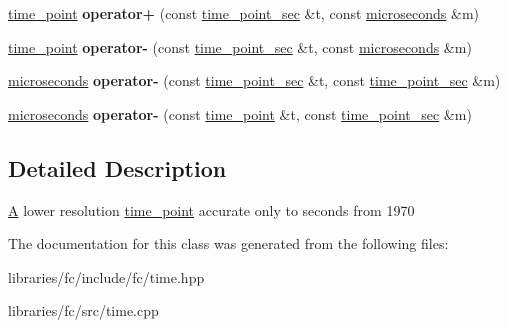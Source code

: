 \begin{DoxyCompactItemize}
\item 
\mbox{\label{classfc_1_1time__point__sec_a33d1bd167b2e7986485b0979250b4b55}} 
\mbox{\hyperlink{classfc_1_1time__point}{time\+\_\+point}} {\bfseries operator+} (const \mbox{\hyperlink{classfc_1_1time__point__sec}{time\+\_\+point\+\_\+sec}} \&t, const \mbox{\hyperlink{classfc_1_1microseconds}{microseconds}} \&m)
\item 
\mbox{\label{classfc_1_1time__point__sec_ab0485dce4d4b0fc5813b33818ff03692}} 
\mbox{\hyperlink{classfc_1_1time__point}{time\+\_\+point}} {\bfseries operator-\/} (const \mbox{\hyperlink{classfc_1_1time__point__sec}{time\+\_\+point\+\_\+sec}} \&t, const \mbox{\hyperlink{classfc_1_1microseconds}{microseconds}} \&m)
\item 
\mbox{\label{classfc_1_1time__point__sec_a40c52d6b3551ec223d707d9ba128dc9b}} 
\mbox{\hyperlink{classfc_1_1microseconds}{microseconds}} {\bfseries operator-\/} (const \mbox{\hyperlink{classfc_1_1time__point__sec}{time\+\_\+point\+\_\+sec}} \&t, const \mbox{\hyperlink{classfc_1_1time__point__sec}{time\+\_\+point\+\_\+sec}} \&m)
\item 
\mbox{\label{classfc_1_1time__point__sec_a1a8ae19b63eb263fc2435ef5ac9bf4f1}} 
\mbox{\hyperlink{classfc_1_1microseconds}{microseconds}} {\bfseries operator-\/} (const \mbox{\hyperlink{classfc_1_1time__point}{time\+\_\+point}} \&t, const \mbox{\hyperlink{classfc_1_1time__point__sec}{time\+\_\+point\+\_\+sec}} \&m)
\end{DoxyCompactItemize}


\subsection{Detailed Description}
\mbox{\hyperlink{struct_a}{A}} lower resolution \mbox{\hyperlink{classfc_1_1time__point}{time\+\_\+point}} accurate only to seconds from 1970 

The documentation for this class was generated from the following files\+:\begin{DoxyCompactItemize}
\item 
libraries/fc/include/fc/time.\+hpp\item 
libraries/fc/src/time.\+cpp\end{DoxyCompactItemize}
